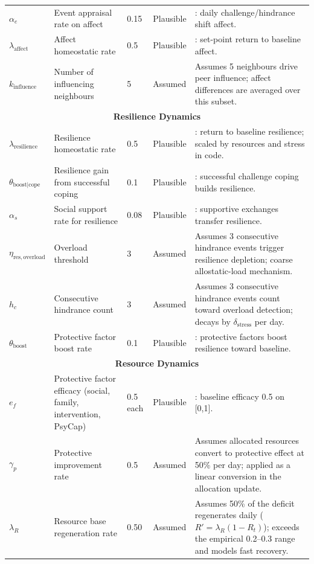 \documentclass[
  letterpaper,
  DIV=11,
  numbers=noendperiod]{scrartcl}
\begin{document}
\begin{longtable}{lp{2.4cm}p{1.6cm}p{1.7cm}p{5.2cm}}
$\alpha_e$ & Event appraisal rate on affect & 0.15 & Plausible & \cite{folkman2020stress}: daily challenge/hindrance shift affect. \\
$\lambda_{\mathrm{affect}}$ & Affect homeostatic rate & 0.5 & Plausible & \cite{friston2016}: set-point return to baseline affect. \\
$k_{\mathrm{influence}}$ & Number of influencing neighbours & 5 & Assumed & Assumes 5 neighbours drive peer influence; affect differences are averaged over this subset. \\
\midrule
\multicolumn{5}{c}{\textbf{Resilience Dynamics}} \\
\midrule
$\lambda_{\mathrm{resilience}}$ & Resilience homeostatic rate & 0.5 & Plausible & \cite{shively2020}: return to baseline resilience; scaled by resources and stress in code. \\
$\theta_{\mathrm{boost|cope}}$ & Resilience gain from successful coping & 0.1 & Plausible & \cite{cavanaugh2000}: successful challenge coping builds resilience. \\
$\alpha_s$ & Social support rate for resilience & 0.08 & Plausible & \cite{Hobfoll1989}: supportive exchanges transfer resilience. \\
$\eta_{\mathrm{res,overload}}$ & Overload threshold & 3 & Assumed & Assumes 3 consecutive hindrance events trigger resilience depletion; coarse allostatic-load mechanism. \\
$h_c$ & Consecutive hindrance count & 3 & Assumed & Assumes 3 consecutive hindrance events count toward overload detection; decays by $\delta_{\mathrm{stress}}$ per day. \\
$\theta_{\mathrm{boost}}$ & Protective factor boost rate & 0.1 & Plausible & \cite{Hobfoll1989}: protective factors boost resilience toward baseline. \\
\midrule
\multicolumn{5}{c}{\textbf{Resource Dynamics}} \\
\midrule
$e_{f}$ & Protective factor efficacy (social, family, intervention, PsyCap) & 0.5 each & Plausible & \cite{Hobfoll1989}: baseline efficacy 0.5 on [0,1]. \\
$\gamma_p$ & Protective improvement rate & 0.5 & Assumed & Assumes allocated resources convert to protective effect at 50\% per day; applied as a linear conversion in the allocation update. \\
$\lambda_R$ & Resource base regeneration rate & 0.50 & Assumed & Assumes 50\% of the deficit regenerates daily ($R' = \lambda_R(1 - R_t)$); exceeds the empirical 0.2--0.3 range and models fast recovery. \\

\end{longtable}
\end{document}
